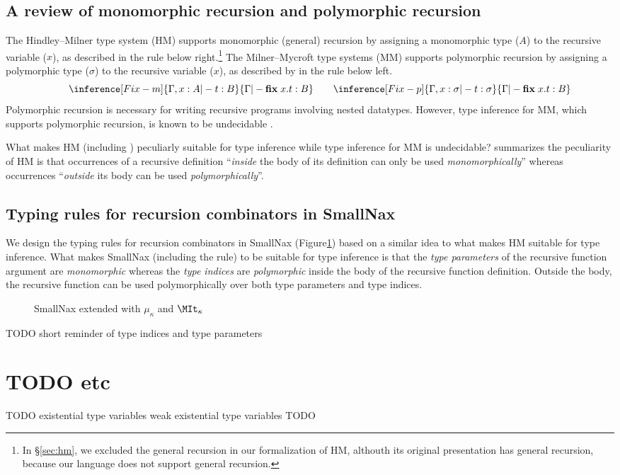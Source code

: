 \subsection{A review of monomorphic recursion and polymorphic recursion}
The Hindley--Milner type system (HM) \cite{DamMil82} supports
monomorphic (general) recursion by assigning a monomorphic type ($A$)
to the recursive variable ($x$), as described in the rule 
below right.\footnote{
	In \S\ref{sec:hm}, we excluded the general recursion in
	our formalization of HM, althouth its original presentation
	has general recursion, because our language does not support
	general recursion.}
The Milner--Mycroft type systems (MM) \cite{Myc84} supports
polymorphic recursion by assigning a polymorphic type ($\sigma$)
to the recursive variable ($x$), as described by in the rule 
below left.
\[
\qquad
\inference[\sc Fix-m]{\Gamma,x:A |- t : B}{
	\Gamma |- \textbf{fix}\;x.t : B}
\qquad
\inference[\sc Fix-p]{\Gamma,x:\sigma |- t : \sigma}{
	\Gamma |- \textbf{fix}\;x.t : B}
\]
Polymorphic recursion is necessary for writing recursive programs involving
nested datatypes. However, type inference for MM, which supports polymorphic
recursion, is known to be undecidable \cite{Hen93}.

What makes HM (including ) peculiarly suitable for
type inference while type inference for MM is undecidable?
\citet{Hen93} summarizes the peculiarity of HM is that occurrences of
a recursive definition ``\emph{inside} the body of its definition can
only be used \emph{monomorphically}'' whereas occurrences ``\emph{outside}
its body can be used \emph{polymorphically}''.

\subsection{Typing rules for recursion combinators in SmallNax}
We design the typing rules for recursion combinators in SmallNax
(Figure\;\ref{fig:SmallNaxRec}) based on a similar idea to
what makes HM suitable for type inference.
What makes SmallNax (including the  rule) to be suitable
for type inference is that the \emph{type parameters} of
the recursive function argument are \emph{monomorphic} whereas
the \emph{type indices} are \emph{polymorphic} inside the body of
the recursive function definition. Outside the body, the recursive function
can be used polymorphically over both type parameters and type indices.

\begin{figure}
\caption{SmallNax extended with $\mu_\kappa$ and $\MIt_\kappa$}
\label{fig:SmallNaxRec}
\end{figure}

TODO short reminder of type indices and type parameters

\section{TODO etc}
\label{sec:naxTyInfer:etc}
TODO
existential type variables
weak existential type variables
TODO

